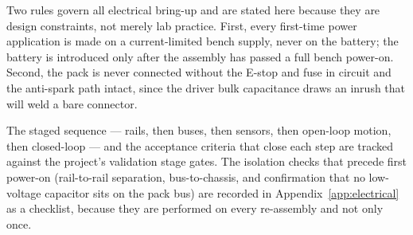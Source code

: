 Two rules govern all electrical bring-up and are stated here because they are
design constraints, not merely lab practice. First, every first-time power
application is made on a current-limited bench supply, never on the battery; the
battery is introduced only after the assembly has passed a full bench power-on.
Second, the pack is never connected without the E-stop and fuse in circuit and
the anti-spark path intact, since the driver bulk capacitance draws an inrush
that will weld a bare connector.

The staged sequence --- rails, then buses, then sensors, then open-loop motion,
then closed-loop --- and the acceptance criteria that close each step are
tracked against the project's validation stage gates.
The isolation checks that precede first power-on
(rail-to-rail separation, bus-to-chassis, and confirmation that no low-voltage
capacitor sits on the pack bus) are recorded in Appendix~\ref{app:electrical}
as a checklist, because they are performed on every re-assembly and not only
once.
